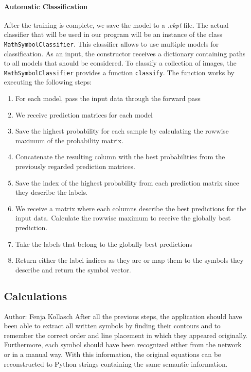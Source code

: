 \documentclass[12pt]{article}
\begin{document}
	\paragraph{Automatic Classification}
	After the training is complete, we save the model to a \textit{.ckpt} file. The actual classifier that will be used in our program will be an instance of the class \texttt{MathSymbolClassifier}. This classifier allows to use multiple models for classification. As an input, the constructor receives a dictionary containing paths to all models that should be considered. To classify a collection of images, the \texttt{MathSymbolClassifier} provides a function \texttt{classify}. The function works by executing the following steps:
	\begin{enumerate}
		\item For each model, pass the input data through the forward pass
		\item We receive prediction matrices for each model
		\item Save the highest probability for each sample by calculating the rowwise maximum of the probability matrix.
		\item Concatenate the resulting column with the best probabilities from the previously regarded prediction matrices.
		\item Save the index of the highest probability from each prediction matrix since they describe the labels.
		\item We receive a matrix where each columns describe the best predictions for the input data. Calculate the rowwise maximum to receive the globally best prediction.
		\item Take the labels that belong to the globally best predictions
		\item Return either the label indices as they are or map them to the symbols they describe and return the symbol vector.
	\end{enumerate}
	
	\subsection{Calculations}
	\small{Author: Fenja Kollasch} \newline \newline
	After all the previous steps, the application should have been able to extract all written symbols by finding their contours and to remember the correct order and line placement in which they appeared originally. Furthermore, each symbol should have been recognized either from the network or in a manual way. With this information, the original equations can be reconstructed to Python strings containing the same semantic information.
	
\end{document}
